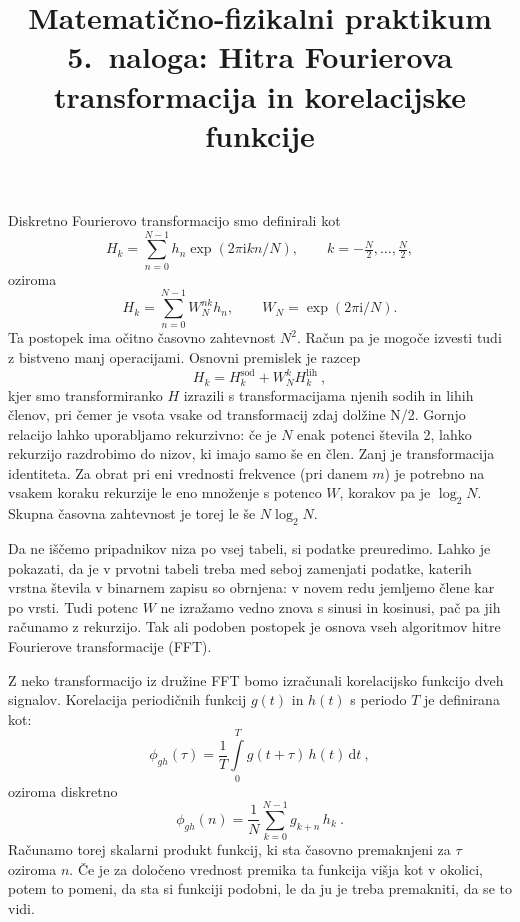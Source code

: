 \documentclass[slovene,11pt,a4paper]{article}
\title{
\sc\large Matematično-fizikalni praktikum \thisyear\\
\bigskip
\bf\Large 5.~naloga: Hitra Fourierova transformacija in korelacijske funkcije
}
\author{}
\date{}
\newcommand{\dd}{\,\mathrm{d}}
\newcommand{\ii}{\mathrm{i}}
\begin{document}
\maketitle
\vspace{-1cm}


Diskretno Fourierovo transformacijo smo definirali kot
\begin{equation*}
H_k = \sum_{n=0}^{N-1}
h_n \exp(2 \pi \ii k n / N),
\qquad k=-\tfrac{N}{2},\dots ,\tfrac{N}{2},
\end{equation*}
oziroma
\begin{equation*}
H_k = \sum_{n=0}^{N-1} W_N^{nk} h_n,
\qquad W_N = \exp(2 \pi \ii / N).
\end{equation*}
Ta postopek ima očitno časovno zahtevnost $N^2$. Račun pa je
mogoče izvesti tudi z bistveno manj operacijami. Osnovni premislek
je razcep
\begin{equation*}
H_k = H_{k}^\mathrm{sod} + W_N^k H_{k}^\mathrm{lih} \>,  
\end{equation*}
kjer smo transformiranko $H$ izrazili s transformacijama njenih
sodih in lihih členov, pri čemer je vsota vsake od transformacij zdaj dolžine N/2.
 Gornjo relacijo lahko uporabljamo rekurzivno:
če je $N$ enak potenci števila 2, lahko rekurzijo razdrobimo
do nizov, ki imajo samo še en člen. Zanj je transformacija
identiteta. Za obrat pri eni vrednosti frekvence (pri danem $m$)
je potrebno na vsakem koraku rekurzije le eno množenje s potenco
$W$, korakov pa je $\log_2 N$.  Skupna časovna zahtevnost je torej
le še $N\log_2 N$.

Da ne iščemo pripadnikov niza po vsej tabeli, si podatke
preuredimo. Lahko je pokazati, da je v prvotni tabeli treba med
seboj zamenjati podatke, katerih vrstna števila v binarnem zapisu
so obrnjena: v novem redu jemljemo člene kar po vrsti. Tudi
potenc $W$ ne izražamo vedno znova s sinusi in kosinusi,
pač pa jih računamo z rekurzijo.  Tak ali podoben postopek
je osnova vseh algoritmov hitre Fourierove transformacije (FFT).

Z neko transformacijo iz družine FFT bomo izračunali korelacijsko
funkcijo dveh signalov. Korelacija periodičnih funk\-cij $g(t)$ in $h(t)$
s periodo $T$ je definirana kot:
\begin{equation*}
\phi_{gh}(\tau)=\frac{1}{T}\int\limits_0^{T} g(t+\tau)\,h(t)\dd t \>,  
\end{equation*}
oziroma diskretno
\begin{equation*}
  \phi_{gh}(n)= \frac{1}{N}\sum_{k=0}^{N-1} g_{k+n}\, h_k \>.
\end{equation*}
Računamo torej skalarni produkt funkcij, ki sta časovno premaknjeni
za $\tau$ oziroma $n$. Če je za določeno vrednost premika ta
funkcija višja kot v okolici, potem to pomeni, da sta si funkciji
podobni, le da ju je treba premakniti, da se to vidi.
\end{document}
